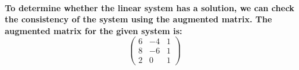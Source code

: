 \paragraph{To determine whether the linear system has a solution, we can check the consistency of the system using the augmented matrix. The augmented matrix for the given system is:
    $$ \begin{pmatrix}
            6 & -4 & 1 \\
            8 & -6 & 1 \\
            2 & 0  & 1
        \end{pmatrix} $$}
